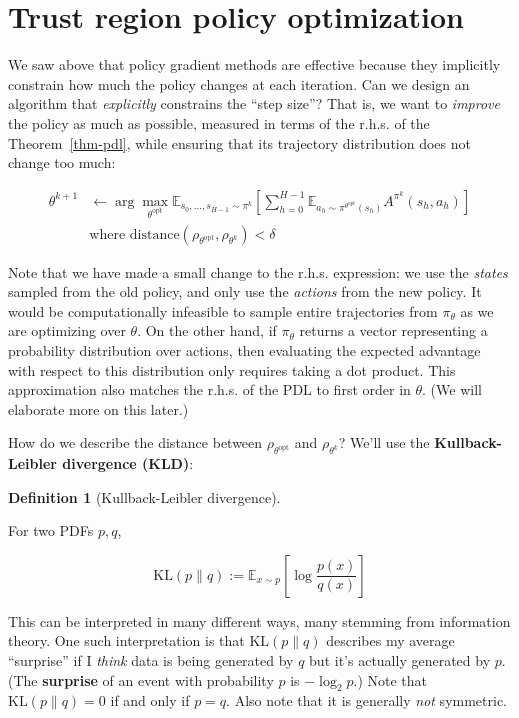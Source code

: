 \documentclass[
  letterpaper,
  DIV=11,
  numbers=noendperiod]{scrreprt}
\theoremstyle{plain}
\theoremstyle{plain}
\theoremstyle{definition}
\theoremstyle{definition}
\newtheorem{definition}{Definition}[chapter]
\theoremstyle{remark}
\begin{document}
\section{Trust region policy optimization}\label{sec-trpo}

We saw above that policy gradient methods are effective because they
implicitly constrain how much the policy changes at each iteration. Can
we design an algorithm that \emph{explicitly} constrains the ``step
size''? That is, we want to \emph{improve} the policy as much as
possible, measured in terms of the r.h.s. of the Theorem~\ref{thm-pdl},
while ensuring that its trajectory distribution does not change too
much:

\[
\begin{aligned}
\theta^{k+1} &\gets \arg\max_{\theta^{\text{opt}}} \mathbb{E}_{s_0, \dots, s_{H-1} \sim \pi^{k}} \left[ \sum_{h=0}^{H-1} \mathbb{E}_{a_h\sim \pi^{\theta^\text{opt}}(s_h)} A^{\pi^{k}}(s_h, a_h) \right] \\
& \text{where } \text{distance}(\rho_{\theta^{\text{opt}}}, \rho_{\theta^k}) < \delta
\end{aligned}
\]

Note that we have made a small change to the r.h.s. expression: we use
the \emph{states} sampled from the old policy, and only use the
\emph{actions} from the new policy. It would be computationally
infeasible to sample entire trajectories from \(\pi_\theta\) as we are
optimizing over \(\theta\). On the other hand, if \(\pi_\theta\) returns
a vector representing a probability distribution over actions, then
evaluating the expected advantage with respect to this distribution only
requires taking a dot product. This approximation also matches the
r.h.s. of the PDL to first order in \(\theta\). (We will elaborate more
on this later.)

How do we describe the distance between \(\rho_{\theta^{\text{opt}}}\)
and \(\rho_{\theta^k}\)? We'll use the \textbf{Kullback-Leibler
divergence (KLD)}:

\begin{definition}[Kullback-Leibler
divergence]\protect\hypertarget{def-kld}{}\label{def-kld}

For two PDFs \(p, q\),

\[\mathrm{KL}\left(p\parallel q\right) := \mathbb{E}_{x \sim p} \left[ \log \frac{p(x)}{q(x)} \right]\]

This can be interpreted in many different ways, many stemming from
information theory. One such interpretation is that
\(\mathrm{KL}\left(p\parallel q\right)\) describes my average
``surprise'' if I \emph{think} data is being generated by \(q\) but it's
actually generated by \(p\). (The \textbf{surprise} of an event with
probability \(p\) is \(- \log_2 p\).) Note that
\(\mathrm{KL}\left(p\parallel q\right) = 0\) if and only if \(p = q\).
Also note that it is generally \emph{not} symmetric.

\end{definition}
\end{document}
